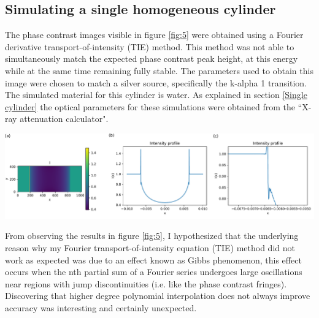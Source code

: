 \documentclass[10pt, a4paper, singlespacing]{report}
\newenvironment{Figure}
    {\par\medskip\noindent\minipage{\linewidth}}
    {\endminipage\par\medskip}
\begin{document}

\subsection{Simulating a single homogeneous cylinder}\label{cylinder}
The phase contrast images visible in figure \ref{fig:5} were obtained using a Fourier derivative transport-of-intensity (TIE) method. This method was not able to simultaneously match the expected phase contrast peak height, at this energy while at the same time remaining fully stable. The parameters used to obtain this image were chosen to match a silver source, specifically the k-alpha 1 transition. The simulated material for this cylinder is water. As explained in section \ref{Single cylinder} the optical parameters for these simulations were obtained from the ``X-ray attenuation calculator".
\begin{Figure}
\centering
\includegraphics[width=\linewidth]{Fourier_intensity_profile.pdf}
\label{fig:5}
\end{Figure}
From observing the results in figure \ref{fig:5}, I hypothesized that the underlying reason why my Fourier transport-of-intensity equation (TIE) method did not work as expected was due to an effect known as Gibbs phenomenon, this effect occurs when the nth partial sum of a Fourier series undergoes large oscillations near regions with jump discontinuities\cite{Gibbs} (i.e. like the phase contrast fringes). Discovering that higher degree polynomial interpolation does not always improve accuracy was interesting and certainly unexpected.
\end{document}
